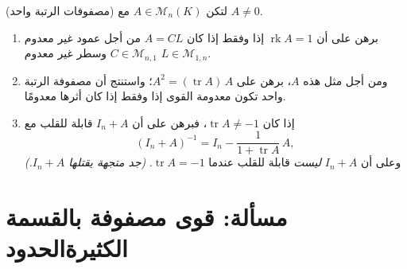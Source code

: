 \begin{exercise}[$\star\star\star$]\label{exo:b1:matrices:12}
(مصفوفات الرتبة واحد) لتكن $A \in \mathcal{M}_n(K)$ مع $A \neq 0$.
\begin{enumerate}
  \item برهن على أن $\operatorname{rk} A = 1$ إذا وفقط إذا كان $A =
        CL$ من أجل عمود غير معدوم $C \in \mathcal{M}_{n,1}$ وسطر
        غير معدوم $L \in \mathcal{M}_{1,n}$.
  \item ومن أجل مثل هذه $A$، برهن على $A^2 = (\operatorname{tr} A)\,A$؛
        واستنتج أن مصفوفة الرتبة واحد تكون معدومة القوى إذا وفقط إذا
        كان أثرها معدومًا.
  \item إذا كان $\operatorname{tr} A \neq -1$، فبرهن على أن $I_n + A$
        قابلة للقلب مع
        \[
        (I_n + A)^{-1} = I_n - \frac{1}{1 + \operatorname{tr}
        A}\,A ,
        \]
        وعلى أن $I_n + A$ \emph{ليست} قابلة للقلب عندما
        $\operatorname{tr} A = -1$. \emph{(جد متجهة يقتلها
        $I_n + A$.)}
\end{enumerate}
\end{exercise}

\section{مسألة: قوى مصفوفة بالقسمة الكثيرةالحدود}

